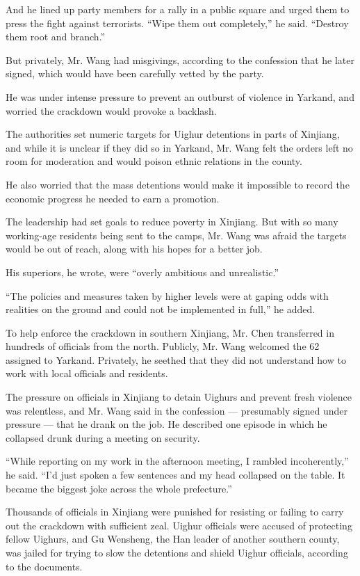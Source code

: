 And he lined up party members for a rally in a public square and urged
them to press the fight against terrorists. ``Wipe them out
completely,'' he said. ``Destroy them root and branch.''

But privately, Mr. Wang had misgivings, according to the confession that
he later signed, which would have been carefully vetted by the party.

He was under intense pressure to prevent an outburst of violence in
Yarkand, and worried the crackdown would provoke a backlash.

The authorities set numeric targets for Uighur detentions in parts of
Xinjiang, and while it is unclear if they did so in Yarkand, Mr. Wang
felt the orders left no room for moderation and would poison ethnic
relations in the county.

He also worried that the mass detentions would make it impossible to
record the economic progress he needed to earn a promotion.

The leadership had set goals to reduce poverty in Xinjiang. But with so
many working-age residents being sent to the camps, Mr. Wang was afraid
the targets would be out of reach, along with his hopes for a better
job.

His superiors, he wrote, were ``overly ambitious and unrealistic.''

``The policies and measures taken by higher levels were at gaping odds
with realities on the ground and could not be implemented in full,'' he
added.

To help enforce the crackdown in southern Xinjiang, Mr. Chen transferred
in hundreds of officials from the north. Publicly, Mr. Wang welcomed the
62 assigned to Yarkand. Privately, he seethed that they did not
understand how to work with local officials and residents.

The pressure on officials in Xinjiang to detain Uighurs and prevent
fresh violence was relentless, and Mr. Wang said in the confession ---
presumably signed under pressure --- that he drank on the job. He
described one episode in which he collapsed drunk during a meeting on
security.

``While reporting on my work in the afternoon meeting, I rambled
incoherently,'' he said. ``I'd just spoken a few sentences and my head
collapsed on the table. It became the biggest joke across the whole
prefecture.''

Thousands of officials in Xinjiang were punished for resisting or
failing to carry out the crackdown with sufficient zeal. Uighur
officials were accused of protecting fellow Uighurs, and Gu Wensheng,
the Han leader of another southern county, was jailed for trying to slow
the detentions and shield Uighur officials, according to the documents.

